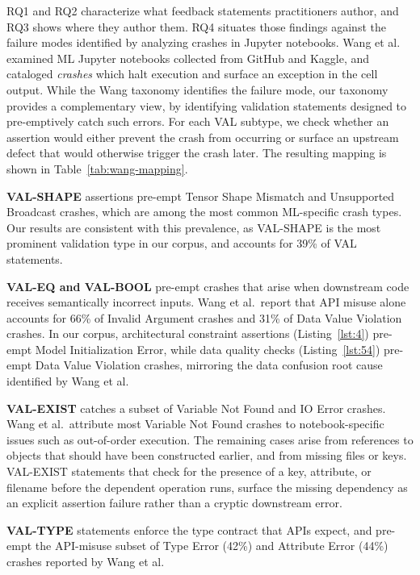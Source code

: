 \documentclass[a4paper,USenglish,cleveref,autoref,thm-restate,anonymous]{lipics-v2021}       %
\begin{document}
RQ1 and RQ2 characterize what feedback statements practitioners author,
and RQ3 shows where they author them.
RQ4 situates those findings against the failure modes
identified by analyzing crashes in Jupyter notebooks.
Wang et al.~\cite{wang2025why} examined ML Jupyter notebooks
collected from GitHub and Kaggle,
and cataloged \emph{crashes}
which halt execution and surface an exception in the cell output.
While the Wang taxonomy identifies the failure mode,
our taxonomy provides a complementary view,
by identifying validation statements
designed to pre-emptively catch such errors.
For each VAL subtype,
we check whether an assertion would
either prevent the crash from occurring
or surface an upstream defect that would otherwise trigger the crash later.
The resulting mapping is shown in Table~\ref{tab:wang-mapping}.

\textbf{VAL-SHAPE} assertions pre-empt
Tensor Shape Mismatch and Unsupported Broadcast crashes,
which are among the most common ML-specific crash types.
Our results are consistent with this prevalence,
as VAL-SHAPE is the most prominent validation type in our corpus,
and accounts for 39\% of VAL statements.

\textbf{VAL-EQ and VAL-BOOL} pre-empt crashes that arise
when downstream code receives semantically incorrect inputs.
Wang et al.\ report that API misuse alone accounts for
66\% of Invalid Argument crashes and 31\% of Data Value Violation crashes.
In our corpus,
architectural constraint assertions (Listing~\ref{lst:4})
pre-empt Model Initialization Error,
while data quality checks (Listing~\ref{lst:54})
pre-empt Data Value Violation crashes,
mirroring the data confusion root cause identified by Wang et al.

\textbf{VAL-EXIST} catches a subset of Variable Not Found and IO Error crashes.
Wang et al.\ attribute most Variable Not Found crashes
to notebook-specific issues such as out-of-order execution.
The remaining cases arise from references to objects
that should have been constructed earlier,
and from missing files or keys.
VAL-EXIST statements that check for the presence of a key, attribute, or filename
before the dependent operation runs,
surface the missing dependency as an explicit assertion failure
rather than a cryptic downstream error.

\textbf{VAL-TYPE} statements enforce the type contract that APIs expect,
and pre-empt the API-misuse subset of Type Error (42\%) and Attribute Error (44\%)
crashes reported by Wang et al.
\end{document}
